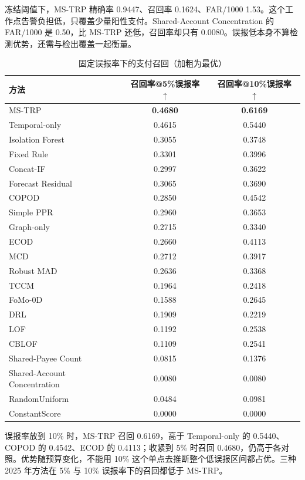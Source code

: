 \documentclass[a4paper,fleqn]{cas-dc}
\begin{document}
冻结阈值下，MS-TRP 精确率 0.9447、召回率 0.1624、FAR/1000 1.53。这个工作点告警负担低，只覆盖少量阳性支付。Shared-Account Concentration 的 FAR/1000 是 0.50，比 MS-TRP 还低，召回率却只有 0.0080。误报低本身不算检测优势，还需与检出覆盖一起衡量。

\begin{table}[pos=tbp]
\small
\caption{固定误报率下的支付召回（加粗为最优）}
\begin{tabular*}{\tblwidth}{@{\extracolsep{\fill}}lcc@{}}
\toprule
方法 & 召回率@5\%误报率 $\uparrow$ & 召回率@10\%误报率 $\uparrow$ \\
\midrule
MS-TRP & \textbf{0.4680} & \textbf{0.6169} \\
Temporal-only & 0.4615 & 0.5440 \\
Isolation Forest\cite{ref2} & 0.3055 & 0.3748 \\
Fixed Rule & 0.3301 & 0.3996 \\
Concat-IF\cite{ref2} & 0.2997 & 0.3622 \\
Forecast Residual & 0.3065 & 0.3690 \\
COPOD\cite{ref14} & 0.2850 & 0.4542 \\
Simple PPR\cite{ref29} & 0.2960 & 0.3653 \\
Graph-only & 0.2715 & 0.3340 \\
ECOD\cite{ref13} & 0.2660 & 0.4113 \\
MCD\cite{ref4} & 0.2712 & 0.3917 \\
Robust MAD & 0.2636 & 0.3368 \\
TCCM\cite{ref40} & 0.1964 & 0.2418 \\
FoMo-0D\cite{ref39} & 0.1588 & 0.2645 \\
DRL\cite{ref38} & 0.1909 & 0.2219 \\
LOF\cite{ref3} & 0.1192 & 0.2538 \\
CBLOF\cite{ref5} & 0.1109 & 0.2541 \\
Shared-Payee Count & 0.0815 & 0.1376 \\
Shared-Account Concentration & 0.0080 & 0.0080 \\
RandomUniform & 0.0484 & 0.0981 \\
ConstantScore & 0.0000 & 0.0000 \\
\bottomrule
\end{tabular*}
\end{table}

误报率放到 10\% 时，MS-TRP 召回 0.6169，高于 Temporal-only 的 0.5440、COPOD 的 0.4542、ECOD 的 0.4113；收紧到 5\% 时召回 0.4680，仍高于各对照。优势随预算变化，不能用 10\% 这个单点去推断整个低误报区间都占优。三种 2025 年方法在 5\% 与 10\% 误报率下的召回都低于 MS-TRP。
\end{document}
